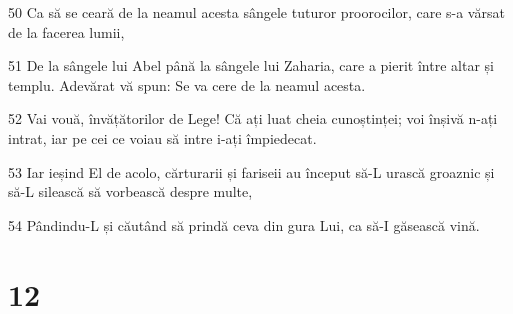 \par 50 Ca să se ceară de la neamul acesta sângele tuturor proorocilor, care s-a vărsat de la facerea lumii,
\par 51 De la sângele lui Abel până la sângele lui Zaharia, care a pierit între altar și templu. Adevărat vă spun: Se va cere de la neamul acesta.
\par 52 Vai vouă, învățătorilor de Lege! Că ați luat cheia cunoștinței; voi înșivă n-ați intrat, iar pe cei ce voiau să intre i-ați împiedecat.
\par 53 Iar ieșind El de acolo, cărturarii și fariseii au început să-L urască groaznic și să-L silească să vorbească despre multe,
\par 54 Pândindu-L și căutând să prindă ceva din gura Lui, ca să-I găsească vină.

\chapter{12}

